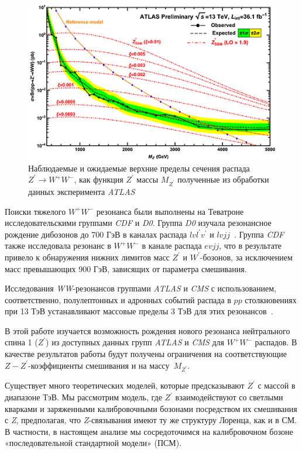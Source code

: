 \begin{figure}[!h]
	\centering
	\includegraphics[width=\textwidth]{figures/graph-1-verify.png}
	\caption{Наблюдаемые и ожидаемые верхние пределы сечения распада ${Z}^{\prime} \rightarrow {W}^{+}{W}^{-} $, как функция ${Z}^{\prime}$ массы ${M}_{{Z}^{\prime}}$ полученные из обработки данных эксперимента \textit{ATLAS}~\cite{2part-pankov}}
	\label{fig:graph-1-verify}
\end{figure}

Поиски тяжелого $W^+W^-$ резонанса были выполнены на Теватроне исследовательскими группами \textit{CDF} и \textit{D0}. Группа \textit{D0} изучала резонансное рождение дибозонов до 700 ГэВ в каналах распада $lvl^\prime v^\prime$ и $lvjj$~\cite{andreev-ee:2012}. Группа \textit{CDF} также исследовала резонанс в $W^+W^-$  в канале распада $evjj$, что в результате привело к обнаружения нижних лимитов масс $Z^\prime$
и $W^\prime$-бозонов, за исключением масс превышающих 900 ГэВ, зависящих от параметра смешивания.

Исследования \textit{WW}-резонансов группами \textit{ATLAS} и \textit{CMS} с использованием, соответственно, полулептонных и адронных событий распада в $pp$ столкновениях при 13 ТэВ устанавливают массовые пределы 3 ТэВ для этих резонансов~\cite{ada-wwz:2013}. 

В этой работе изучается возможность рождения нового резонанса нейтрального спина 1 ($Z^\prime$) из доступных данных групп \textit{ATLAS} и \textit{CMS} для $W^+W^-$ распадов. В качестве результатов работы будут получены ограничения на соответствующие $Z-Z^\prime$-коэффициенты смешивания и на массу~$M_{Z^\prime}$.

Существует много теоретических моделей, которые предсказывают $Z^\prime$ с массой в диапазоне ТэВ. Мы рассмотрим модель, где $Z^\prime$ взаимодействуют со светлыми кварками и заряженными калибровочными бозонами посредством их смешивания с \textit{Z}, предполагая, что \textit{Z}-связывания имеют ту же структуру Лоренца, как и в СМ. В частности, в настоящем анализе мы сосредоточимся на калибровочном бозоне «последовательной стандартной модели» (ПСМ).

